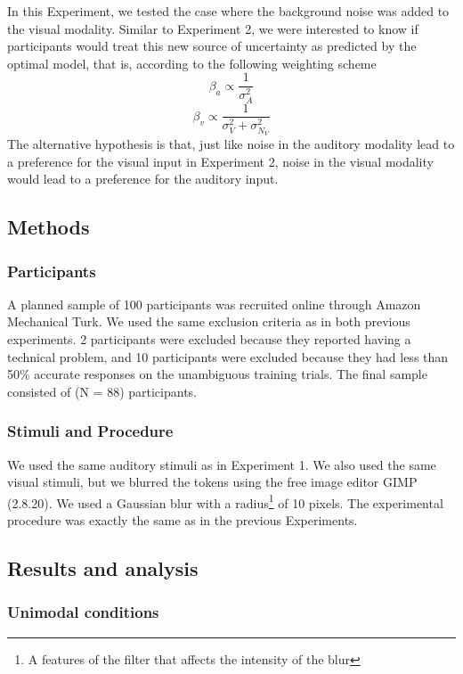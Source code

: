 \documentclass[english,man]{apa6}
\theoremstyle{definition}
\theoremstyle{definition}
\theoremstyle{definition}
\theoremstyle{remark}
\begin{document}
In this Experiment, we tested the case where the background noise was
added to the visual modality. Similar to Experiment 2, we were
interested to know if participants would treat this new source of
uncertainty as predicted by the optimal model, that is, according to the
following weighting scheme \[\beta_a \propto \frac{1}{\sigma^2_{A}}\]
\[\beta_v \propto \frac{1}{\sigma^2_{V}+\sigma^2_{N_V}}\] The
alternative hypothesis is that, just like noise in the auditory modality
lead to a preference for the visual input in Experiment 2, noise in the
visual modality would lead to a preference for the auditory input.

\subsection{Methods}\label{methods-2}

\subsubsection{Participants}\label{participants-2}

A planned sample of 100 participants was recruited online through Amazon
Mechanical Turk. We used the same exclusion criteria as in both previous
experiments. 2 participants were excluded because they reported having a
technical problem, and 10 participants were excluded because they had
less than 50\% accurate responses on the unambiguous training trials.
The final sample consisted of (N = 88) participants.

\subsubsection{Stimuli and Procedure}\label{stimuli-and-procedure-1}

We used the same auditory stimuli as in Experiment 1. We also used the
same visual stimuli, but we blurred the tokens using the free image
editor GIMP (2.8.20). We used a Gaussian blur with a
radius\footnote{A features of the filter that affects the intensity of the blur}
of 10 pixels. The experimental procedure was exactly the same as in the
previous Experiments.

\subsection{Results and analysis}\label{results-and-analysis-2}

\subsubsection{Unimodal conditions}\label{unimodal-conditions-2}
\end{document}
